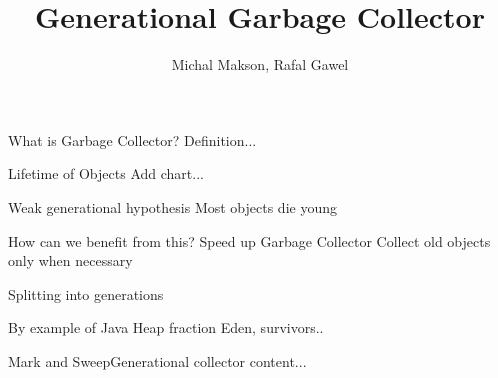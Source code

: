 \documentclass[presentation]{beamer}
\title{Generational Garbage Collector}
\author{Michal Makson, Rafal Gawel}
\institute{AGH}
\date{}
\begin{document}
\begin{frame}
  \titlepage
\end{frame}

\begin{frame}{What is Garbage Collector?}
Definition...
\end{frame}

\begin{frame}{Lifetime of Objects}
Add chart...
\end{frame}

\begin{frame}{Weak generational hypothesis}
Most objects die young
\end{frame}

\begin{frame}{How can we benefit from this?}
Speed up Garbage Collector
Collect old objects only when necessary
\end{frame}

\begin{frame}
Splitting into generations
\end{frame}

\begin{frame}
By example of Java Heap fraction Eden, survivors..
\end{frame}

\begin{frame}{Mark and Sweep}{Generational collector}
content...
\end{frame}
\end{document}
